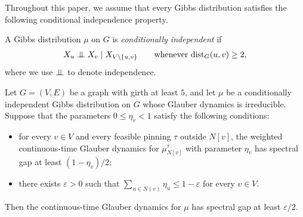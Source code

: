 \documentclass[a4paper,12pt]{article}
\theoremstyle{plain}
\theoremstyle{definition}
\newcommand{\dist}{\mathrm{dist}}
\renewcommand{\epsilon}{\varepsilon}
\newcommand{\indep}{\mathrel{\perp\mkern-10mu\perp}}
\begin{document}
Throughout this paper, we assume that every Gibbs distribution satisfies the following conditional independence property.
\begin{definition}\label{def:cond-indep}
  A Gibbs distribution $\mu$ on $G$ is \emph{conditionally independent} if
  \begin{align*}
    X_u\indep X_v\mid X_{V\setminus\{u,v\}}
    \qquad\text{whenever }\dist_G(u,v)\geq2,
  \end{align*}
where we use $\indep$ to denote independence.
\end{definition}


\begin{theorem} \label{thm:local-to-global}
Let $G=(V,E)$ be a graph with girth at least $5$, and let $\mu$ be a conditionally independent Gibbs
distribution on $G$ whose Glauber dynamics is irreducible.  Suppose that
the parameters $0\leq\eta_v<1$ satisfy the following conditions:
\begin{itemize}
\item for every $v\in V$ and every feasible pinning $\tau$ outside $N[v]$, the
weighted continuous-time Glauber dynamics for $\mu_{N[v]}^\tau$ with
parameter $\eta_v$ has spectral gap at least $(1-\eta_v)/2$;
\item there exists $\epsilon>0$ such that
$\sum_{u\in N(v)}\eta_u\leq1-\epsilon$ for every $v\in V$.
\end{itemize}
Then the continuous-time Glauber dynamics for $\mu$ has spectral gap at
least $\epsilon/2$.
\end{theorem}
\end{document}
